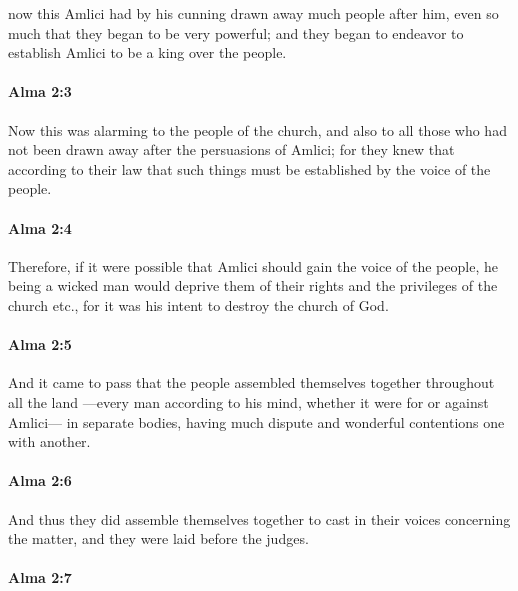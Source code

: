 			now this Amlici had by his cunning drawn away much people after him,
			even so much that they began to be very powerful;
			and they began to endeavor to establish Amlici to be a king over the people.

		\paragraph{Alma 2:3} %
			\label{ALMA-2-3}

			Now this was alarming to the people of the church,
			and also to all those who had not been drawn away after the persuasions of Amlici;
			for they knew that according to their law
			that such things must be established by the voice of the people.

		\paragraph{Alma 2:4} %
			\label{ALMA-2-4}

			Therefore, if it were possible
			that Amlici should gain the voice of the people,
			he being a wicked man would deprive them
			of their rights and the privileges of the church etc.,
			for it was his intent to destroy the church of God.

		\paragraph{Alma 2:5} %
			\label{ALMA-2-5}

			And it came to pass that
			the people assembled themselves together throughout all the land
			---every man according to his mind,
			whether it were for or against Amlici---
			in separate bodies,
			having much dispute and wonderful contentions one with another.

		\paragraph{Alma 2:6} %
			\label{ALMA-2-6}

			And thus they did assemble themselves together
			to cast in their voices concerning the matter,
			and they were laid before the judges.

		\paragraph{Alma 2:7} %
			\label{ALMA-2-7}

